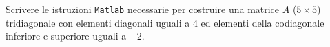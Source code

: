 Scrivere le istruzioni {\tt Matlab} necessarie per costruire
 una matrice $A$ ($5\times 5$) tridiagonale con elementi diagonali
uguali a $4$ ed elementi della codiagonale inferiore e superiore uguali a  $-2$. 